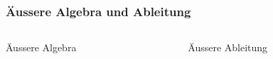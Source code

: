 %
%
%
\bgroup
\begin{frame}[t]
\setlength{\abovedisplayskip}{5pt}
\setlength{\belowdisplayskip}{5pt}
\frametitle{Äussere Algebra und Ableitung}
\vspace{-20pt}
\begin{columns}[t,onlytextwidth]
\begin{column}{0.48\textwidth}
\begin{block}{Äussere Algebra}
\end{block}
\end{column}
\begin{column}{0.48\textwidth}
\begin{block}{Äussere Ableitung}
\end{block}
\end{column}
\end{columns}
\end{frame}
\egroup
